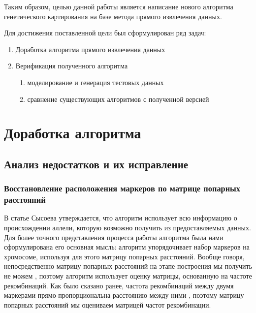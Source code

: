 \documentclass{matmex-diploma-custom}
\begin{document}
Таким образом, целью данной работы является написание нового алгоритма
генетического картирования на базе метода прямого извлечения данных.

\bigskip

Для достижения поставленной цели был сформулирован ряд задач:

\begin{enumerate}
\item Доработка алгоритма прямого извлечения данных
\item Верификация полученного алгоритма
  \begin{enumerate}
  \item моделирование и генерация тестовых
    данных
  \item сравнение существующих алгоритмов с полученной версией
  \end{enumerate}
\end{enumerate}

\section{Доработка алгоритма}

\subsection{Анализ недостатков и их исправление}

\subsubsection{Восстановление расположения маркеров по матрице
  попарных расстояний}

В статье Сысоева \cite{sysoev} утверждается, что алгоритм использует
всю информацию о происхождении аллели, которую возможно получить из
предоставляемых данных. Для более точного представления процесса
работы алгоритма была нами сформулирована его основная мысль: алгоритм
упорядочивает набор маркеров на хромосоме, используя для этого матрицу
попарных расстояний. Вообще говоря, непосредственно матрицу попарных
расстояний на этапе построения мы получить не можем
\cite{bohonak2002ibd}, поэтому алгоритм использует оценку матрицы,
основанную на частоте рекомбинаций. Как было сказано ранее, частота
рекомбинаций между двумя маркерами прямо-пропорциональна расстоянию
между ними \cite{stam1993construction}, поэтому матрицу попарных
расстояний мы оцениваем матрицей частот рекомбинации.
\end{document}
